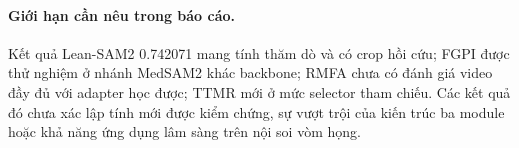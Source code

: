 \paragraph{Giới hạn cần nêu trong báo cáo.}
Kết quả Lean-SAM2 0.742071 mang tính thăm dò và có crop hồi
cứu; FGPI được thử nghiệm ở nhánh MedSAM2 khác backbone;
RMFA chưa có đánh giá video đầy đủ với adapter học được;
TTMR mới ở mức selector tham chiếu. Các kết quả đó chưa xác lập
tính mới được kiểm chứng, sự vượt trội của kiến trúc ba module
hoặc khả năng ứng dụng lâm sàng trên nội soi vòm họng.
